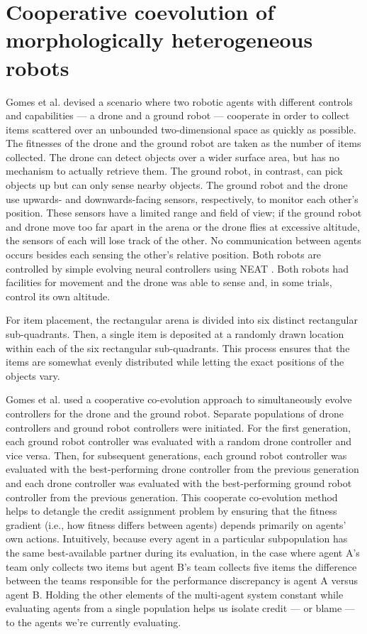 \section{Cooperative coevolution of morphologically heterogeneous robots \cite{gomes2015cooperative}}

Gomes et al. devised a scenario where two robotic agents with different controls and capabilities --- a drone and a ground robot --- cooperate in order to collect items scattered over an unbounded two-dimensional space as quickly as possible.
The fitnesses of the drone and the ground robot are taken as the number of items collected.
The drone can detect objects over a wider surface area, but has no mechanism to actually retrieve them.
The ground robot, in contrast, can pick objects up but can only sense nearby objects.
The ground robot and the drone use upwards- and downwards-facing sensors, respectively, to monitor each other's position.
These sensors have a limited range and field of view; if the ground robot and drone move too far apart in the arena or the drone flies at excessive altitude, the sensors of each will lose track of the other.
No communication between agents occurs besides each sensing the other's relative position.
Both robots are controlled by simple evolving neural controllers using NEAT \cite{stanley2002evolving}.
Both robots had facilities for movement and the drone was able to sense and, in some trials, control its own altitude.

For item placement, the rectangular arena is divided into six distinct rectangular sub-quadrants.
Then, a single item is deposited at a randomly drawn location within each of the six rectangular sub-quadrants.
This process ensures that the items are somewhat evenly distributed while letting the exact positions of the objects vary.

Gomes et al. used a cooperative co-evolution approach to simultaneously evolve controllers for the drone and the ground robot.
Separate populations of drone controllers and ground robot controllers were initiated.
For the first generation, each ground robot controller was evaluated with a random drone controller and vice versa.
Then, for subsequent generations, each ground robot controller was evaluated with the best-performing drone controller from the previous generation and each drone controller was evaluated with the best-performing ground robot controller from the previous generation.
This cooperate co-evolution method helps to detangle the credit assignment problem by ensuring that the fitness gradient (i.e., how fitness differs between agents) depends primarily on agents' own actions.
Intuitively, because every agent in a particular subpopulation has the same best-available partner during its evaluation, in the case where agent A's team only collects two items but agent B's team collects five items the difference between the teams responsible for the performance discrepancy is agent A versus agent B.
Holding the other elements of the multi-agent system constant while evaluating agents from a single population helps us isolate credit --- or blame --- to the agents we're currently evaluating.

